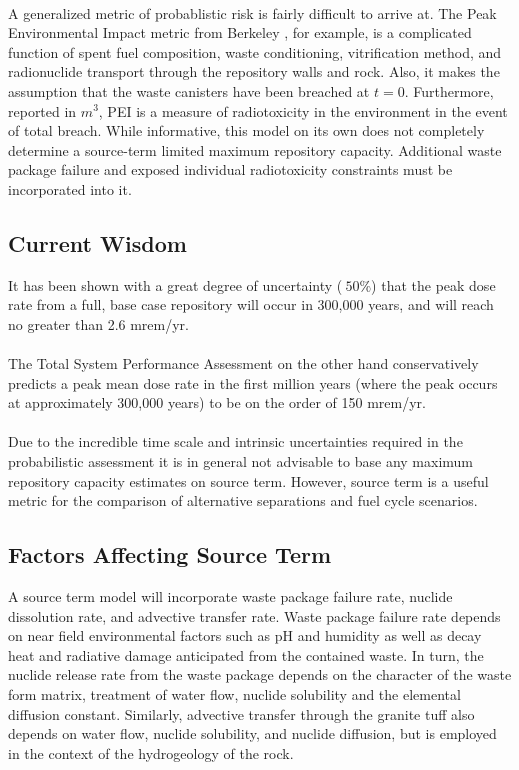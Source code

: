 \paragraph{}
A generalized metric of probablistic risk is fairly difficult to arrive at. The Peak Environmental Impact metric from Berkeley \cite{AhnGlobal}, for example, is a complicated function of spent fuel composition, waste conditioning, vitrification method, and radionuclide transport through the repository walls and rock. Also, it makes the assumption that the waste canisters have been breached at $t=0$. Furthermore, reported in $m^3$, PEI is a measure of radiotoxicity in the environment in the event of total breach. While informative, this model on its own does not completely determine a source-term limited maximum repository capacity. Additional waste package failure and exposed individual radiotoxicity constraints must be incorporated into it.
\subsection{Current Wisdom}
It has been shown with a great degree of uncertainty ($~50\%$) that the peak dose rate from a full, base case repository will occur in 300,000 years, and will reach no greater than 2.6 mrem/yr.\cite{Jun}
\paragraph{}
The Total System Performance Assessment on the other hand conservatively predicts a peak mean dose rate in the first million years (where the peak occurs at approximately 300,000 years) to be on the order of 150 mrem/yr.\cite{TSPA} 
\paragraph{}
Due to the incredible time scale and intrinsic uncertainties required in the probabilistic assessment it is in general not advisable to base any maximum repository capacity estimates on source term. However, source term is a useful metric for the comparison of alternative separations and fuel cycle scenarios.

\subsection{Factors Affecting Source Term}
A source term model will incorporate waste package failure rate, nuclide dissolution rate, and advective transfer rate. Waste package failure rate depends on near field environmental factors such as pH and humidity as well as decay heat and radiative damage anticipated from the contained waste. In turn, the nuclide release rate from the waste package depends on the character of the waste form matrix, treatment of water flow, nuclide solubility and the elemental diffusion constant. Similarly, advective transfer through the granite tuff also depends on water flow, nuclide solubility, and nuclide diffusion, but is employed in the context of the hydrogeology of the rock.   
